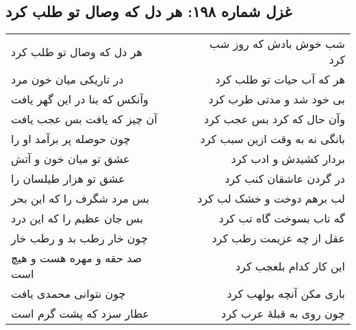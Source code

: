 \begin{center}
\section*{غزل شماره ۱۹۸: هر دل که وصال تو طلب کرد}
\label{sec:198}
\begin{longtable}{l p{0.5cm} r}
هر دل که وصال تو طلب کرد
&&
شب خوش بادش که روز شب کرد
\\
در تاریکی میان خون مرد
&&
هر که آب حیات تو طلب کرد
\\
وآنکس که بنا در این گهر یافت
&&
بی خود شد و مدتی طرب کرد
\\
آن چیز که یافت بس عجب یافت
&&
وآن حال که کرد بس عجب کرد
\\
چون حوصله پر برآمد او را
&&
بانگی نه به وقت ازین سبب کرد
\\
عشق تو میان خون و آتش
&&
بردار کشیدش و ادب کرد
\\
عشق تو هزار طیلسان را
&&
در گردن عاشقان کنب کرد
\\
بس مرد شگرف را که این بحر
&&
لب برهم دوخت و خشک لب کرد
\\
بس جان عظیم را که این درد
&&
گه تاب بسوخت گاه تب کرد
\\
چون خار رطب بد و رطب خار
&&
عقل از چه عزیمت رطب کرد
\\
صد حقه و مهره هست و هیچ است
&&
این کار کدام بلعجب کرد
\\
چون نتوانی محمدی یافت
&&
باری مکن آنچه بولهب کرد
\\
عطار سزد که پشت گرم است
&&
چون روی به قبلهٔ عرب کرد
\\
\end{longtable}
\end{center}
